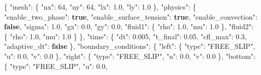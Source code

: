 \documentclass[
  10pt,
]{article}
\newenvironment{Shaded}{}{}
\newcommand{\DataTypeTok}[1]{\textcolor[rgb]{0.56,0.13,0.00}{#1}}
\newcommand{\DecValTok}[1]{\textcolor[rgb]{0.25,0.63,0.44}{#1}}
\newcommand{\FloatTok}[1]{\textcolor[rgb]{0.25,0.63,0.44}{#1}}
\newcommand{\FunctionTok}[1]{\textcolor[rgb]{0.02,0.16,0.49}{#1}}
\newcommand{\KeywordTok}[1]{\textcolor[rgb]{0.00,0.44,0.13}{\textbf{#1}}}
\newcommand{\StringTok}[1]{\textcolor[rgb]{0.25,0.44,0.63}{#1}}
\begin{document}
\begin{Shaded}
\begin{Highlighting}[]
\FunctionTok{\{}
  \DataTypeTok{"mesh"}\FunctionTok{:} \FunctionTok{\{}
    \DataTypeTok{"nx"}\FunctionTok{:} \DecValTok{64}\FunctionTok{,}
    \DataTypeTok{"ny"}\FunctionTok{:} \DecValTok{64}\FunctionTok{,}
    \DataTypeTok{"lx"}\FunctionTok{:} \FloatTok{1.0}\FunctionTok{,}
    \DataTypeTok{"ly"}\FunctionTok{:} \FloatTok{1.0}
  \FunctionTok{\},}
  \DataTypeTok{"physics"}\FunctionTok{:} \FunctionTok{\{}
    \DataTypeTok{"enable\_two\_phase"}\FunctionTok{:} \KeywordTok{true}\FunctionTok{,}
    \DataTypeTok{"enable\_surface\_tension"}\FunctionTok{:} \KeywordTok{true}\FunctionTok{,}
    \DataTypeTok{"enable\_convection"}\FunctionTok{:} \KeywordTok{false}\FunctionTok{,}
    \DataTypeTok{"sigma"}\FunctionTok{:} \FloatTok{1.0}\FunctionTok{,}
    \DataTypeTok{"gx"}\FunctionTok{:} \FloatTok{0.0}\FunctionTok{,}
    \DataTypeTok{"gy"}\FunctionTok{:} \FloatTok{0.0}\FunctionTok{,}
    \DataTypeTok{"fluid1"}\FunctionTok{:} \FunctionTok{\{}
      \DataTypeTok{"rho"}\FunctionTok{:} \FloatTok{1.0}\FunctionTok{,}
      \DataTypeTok{"mu"}\FunctionTok{:} \FloatTok{1.0}
    \FunctionTok{\},}
    \DataTypeTok{"fluid2"}\FunctionTok{:} \FunctionTok{\{}
      \DataTypeTok{"rho"}\FunctionTok{:} \FloatTok{1.0}\FunctionTok{,}
      \DataTypeTok{"mu"}\FunctionTok{:} \FloatTok{1.0}
    \FunctionTok{\}}
  \FunctionTok{\},}
  \DataTypeTok{"time"}\FunctionTok{:} \FunctionTok{\{}
    \DataTypeTok{"dt"}\FunctionTok{:} \FloatTok{0.005}\FunctionTok{,}
    \DataTypeTok{"t\_final"}\FunctionTok{:} \FloatTok{0.05}\FunctionTok{,}
    \DataTypeTok{"cfl\_max"}\FunctionTok{:} \FloatTok{0.3}\FunctionTok{,}
    \DataTypeTok{"adaptive\_dt"}\FunctionTok{:} \KeywordTok{false}
  \FunctionTok{\},}
  \DataTypeTok{"boundary\_conditions"}\FunctionTok{:} \FunctionTok{\{}
    \DataTypeTok{"left"}\FunctionTok{:} \FunctionTok{\{}
      \DataTypeTok{"type"}\FunctionTok{:} \StringTok{"FREE\_SLIP"}\FunctionTok{,}
      \DataTypeTok{"u"}\FunctionTok{:} \FloatTok{0.0}\FunctionTok{,}
      \DataTypeTok{"v"}\FunctionTok{:} \FloatTok{0.0}
    \FunctionTok{\},}
    \DataTypeTok{"right"}\FunctionTok{:} \FunctionTok{\{}
      \DataTypeTok{"type"}\FunctionTok{:} \StringTok{"FREE\_SLIP"}\FunctionTok{,}
      \DataTypeTok{"u"}\FunctionTok{:} \FloatTok{0.0}\FunctionTok{,}
      \DataTypeTok{"v"}\FunctionTok{:} \FloatTok{0.0}
    \FunctionTok{\},}
    \DataTypeTok{"bottom"}\FunctionTok{:} \FunctionTok{\{}
      \DataTypeTok{"type"}\FunctionTok{:} \StringTok{"FREE\_SLIP"}\FunctionTok{,}
      \DataTypeTok{"u"}\FunctionTok{:} \FloatTok{0.0}\FunctionTok{,}

\end{Highlighting}
\end{Shaded}
\end{document}
